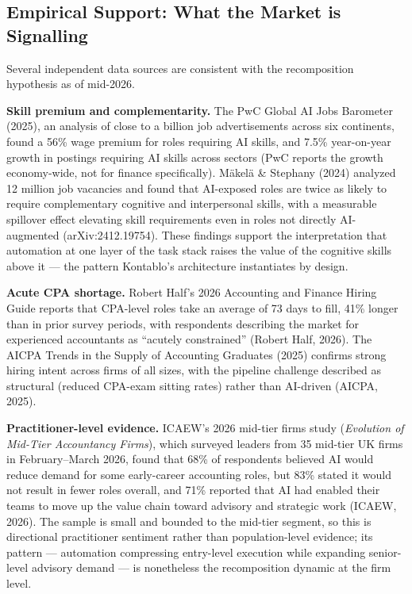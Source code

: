\subsection{Empirical Support: What the Market is Signalling}
\label{subsec:market_signals}

Several independent data sources are consistent with the recomposition
hypothesis as of mid-2026.

\textbf{Skill premium and complementarity.} The PwC Global AI Jobs
Barometer (2025), an analysis of close to a billion job advertisements
across six continents, found a 56\% wage premium for roles requiring AI
skills, and 7.5\% year-on-year growth in postings requiring AI skills
across sectors (PwC reports the growth economy-wide, not for finance
specifically). Mäkelä \& Stephany (2024) analyzed 12 million job vacancies
and found that AI-exposed roles are twice as likely to require
complementary cognitive and interpersonal skills, with a measurable spillover
effect elevating skill requirements even in roles not directly AI-augmented
(arXiv:2412.19754). These findings support the interpretation that
automation at one layer of the task stack raises the value of the cognitive
skills above it --- the pattern Kontablo's architecture instantiates by design.

\textbf{Acute CPA shortage.} Robert Half's 2026 Accounting and Finance
Hiring Guide reports that CPA-level roles take an average of 73 days to
fill, 41\% longer than in prior survey periods, with respondents describing
the market for experienced accountants as ``acutely constrained'' (Robert
Half, 2026). The AICPA Trends in the Supply of Accounting Graduates (2025)
confirms strong hiring intent across firms of all sizes, with the pipeline
challenge described as structural (reduced CPA-exam sitting rates) rather
than AI-driven (AICPA, 2025).

\textbf{Practitioner-level evidence.} ICAEW's 2026 mid-tier firms study
(\emph{Evolution of Mid-Tier Accountancy Firms}), which surveyed leaders
from 35 mid-tier UK firms in February--March 2026, found that 68\% of
respondents believed AI would reduce demand for some early-career
accounting roles, but 83\% stated it would not result in fewer roles
overall, and 71\% reported that AI had enabled their teams to move up the
value chain toward advisory and strategic work (ICAEW, 2026). The sample
is small and bounded to the mid-tier segment, so this is directional
practitioner sentiment rather than population-level evidence; its pattern
--- automation compressing entry-level execution while expanding
senior-level advisory demand --- is nonetheless the recomposition dynamic
at the firm level.

